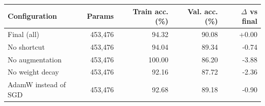 \begin{tabular}{lrrrr}
\toprule
Configuration & Params & Train acc. (\%) & Val. acc. (\%) & $\Delta$ vs final \\
\midrule
Final (all) & 453,476 & 94.32 & 90.08 & +0.00 \\
No shortcut & 453,476 & 94.04 & 89.34 & -0.74 \\
No augmentation & 453,476 & 100.00 & 86.20 & -3.88 \\
No weight decay & 453,476 & 92.16 & 87.72 & -2.36 \\
AdamW instead of SGD & 453,476 & 92.68 & 89.18 & -0.90 \\
\bottomrule
\end{tabular}

